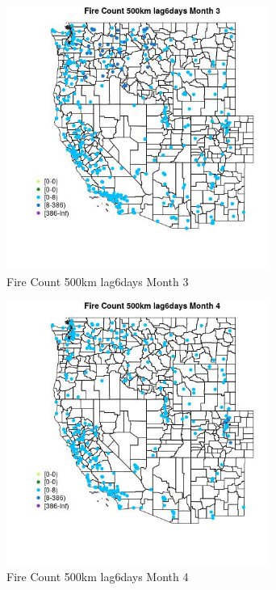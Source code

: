 \begin{figure} 
\centering  
\includegraphics[width=0.77\textwidth]{Code_Outputs/Report_ML_input_PM25_Step4_part_e_de_duplicated_aves_compiled_2019-05-18wNAs_MapObsMo3Fire_Count_500km_lag6days.jpg} 
\caption{\label{fig:Report_ML_input_PM25_Step4_part_e_de_duplicated_aves_compiled_2019-05-18wNAsMapObsMo3Fire_Count_500km_lag6days}Fire Count 500km lag6days Month 3} 
\end{figure} 
 

\begin{figure} 
\centering  
\includegraphics[width=0.77\textwidth]{Code_Outputs/Report_ML_input_PM25_Step4_part_e_de_duplicated_aves_compiled_2019-05-18wNAs_MapObsMo4Fire_Count_500km_lag6days.jpg} 
\caption{\label{fig:Report_ML_input_PM25_Step4_part_e_de_duplicated_aves_compiled_2019-05-18wNAsMapObsMo4Fire_Count_500km_lag6days}Fire Count 500km lag6days Month 4} 
\end{figure} 
 

